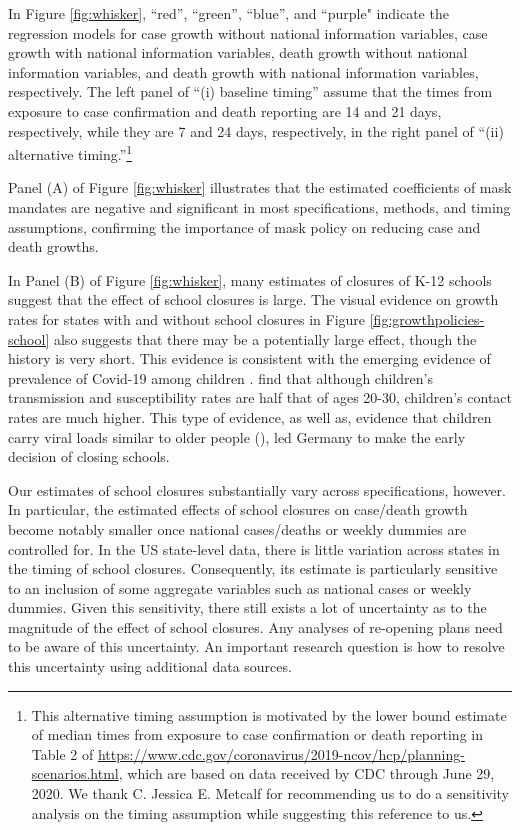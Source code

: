 \documentclass[3p, longtitle]{elsarticle}
\theoremstyle{definition}
\begin{document}
In Figure \ref{fig:whisker}, ``red'', ``green'', ``blue'', and ``purple" indicate the regression models for case growth without national information variables, case growth with national information variables, death growth without national information variables, and death growth with national information variables, respectively. The left panel of ``(i) baseline timing'' assume that the times from exposure to case confirmation and death reporting are 14 and 21 days, respectively,  while they are 7 and 24 days, respectively, in the right panel of ``(ii) alternative timing.''\footnote{This alternative timing assumption is motivated by the lower bound estimate of median times from exposure to case confirmation or death reporting in Table 2 of \url{https://www.cdc.gov/coronavirus/2019-ncov/hcp/planning-scenarios.html}, which are based on data received by CDC through June 29, 2020.  We thank C. Jessica E. Metcalf for recommending us to do a sensitivity analysis on the timing assumption while suggesting this reference to us.}

Panel (A) of Figure  \ref{fig:whisker} illustrates that the estimated coefficients of mask mandates are negative and significant in most specifications, methods, and timing assumptions, confirming the importance of mask policy on reducing case and death growths.  %

In Panel (B) of  Figure  \ref{fig:whisker}, many estimates of closures of K-12 schools  suggest that  the effect of school closures is large. The visual evidence on growth rates for states with and without school closures in Figure \ref{fig:growthpolicies-school} also suggests that there may be a potentially large effect, though the history is very short.  This evidence is consistent
with the emerging evidence of prevalence of Covid-19 among children  \citep{Lee2020jama,Szablewski2020cdc}. \cite{children:nature} find that although children's
transmission and susceptibility rates are half that of ages 20-30,
children's contact rates are much higher.
This type of evidence, as well as, evidence that children carry viral
loads similar to older people (\cite{children:germany}), led Germany to make the early decision of closing schools.

Our estimates of school closures substantially vary  across  specifications, however. In particular, the estimated effects of school closures on case/death growth become notably smaller once national cases/deaths or weekly dummies are controlled for.
In the US state-level data,  there is little variation across states in the timing of school closures.
Consequently, its estimate is particularly sensitive to an inclusion of some aggregate variables such as national cases or weekly dummies.  Given this sensitivity,  there still exists a lot of uncertainty as to the magnitude of the effect of school closures. Any analyses of re-opening plans need to be aware of this uncertainty.  An important research question is how to resolve this uncertainty using additional data sources.
\end{document}
